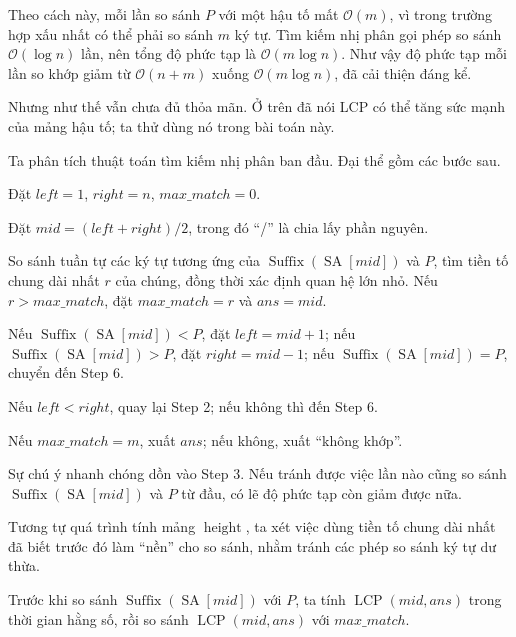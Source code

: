 \documentclass[11pt]{article}
\newcommand{\Oh}{\mathcal{O}}
\newcommand{\SA}{\operatorname{SA}}
\newcommand{\Height}{\operatorname{height}}
\newcommand{\Suf}{\operatorname{Suffix}}
\newcommand{\LCP}{\operatorname{LCP}}
\begin{document}
Theo cách này, mỗi lần so sánh \(P\) với một hậu tố mất \(\Oh(m)\), vì trong
trường hợp xấu nhất có thể phải so sánh \(m\) ký tự. Tìm kiếm nhị phân gọi
phép so sánh \(\Oh(\log n)\) lần, nên tổng độ phức tạp là \(\Oh(m\log n)\).
Như vậy độ phức tạp mỗi lần so khớp giảm từ \(\Oh(n+m)\) xuống
\(\Oh(m\log n)\), đã cải thiện đáng kể.

Nhưng như thế vẫn chưa đủ thỏa mãn. Ở trên đã nói LCP có thể tăng sức mạnh
của mảng hậu tố; ta thử dùng nó trong bài toán này.

Ta phân tích thuật toán tìm kiếm nhị phân ban đầu. Đại thể gồm các bước sau.

\begin{description}[leftmargin=5.8em,style=nextline]
  \item[Step 1.] Đặt \(\mathit{left}=1\), \(\mathit{right}=n\),
  \(\mathit{max\_match}=0\).
  \item[Step 2.] Đặt
  \(\mathit{mid}=(\mathit{left}+\mathit{right})/2\), trong đó ``/'' là chia
  lấy phần nguyên.
  \item[Step 3.] So sánh tuần tự các ký tự tương ứng của
  \(\Suf(\SA[\mathit{mid}])\) và \(P\), tìm tiền tố chung dài nhất \(r\) của
  chúng, đồng thời xác định quan hệ lớn nhỏ. Nếu
  \(r>\mathit{max\_match}\), đặt \(\mathit{max\_match}=r\) và
  \(\mathit{ans}=\mathit{mid}\).
  \item[Step 4.] Nếu \(\Suf(\SA[\mathit{mid}])<P\), đặt
  \(\mathit{left}=\mathit{mid}+1\); nếu \(\Suf(\SA[\mathit{mid}])>P\), đặt
  \(\mathit{right}=\mathit{mid}-1\); nếu \(\Suf(\SA[\mathit{mid}])=P\), chuyển
  đến Step 6.
  \item[Step 5.] Nếu \(\mathit{left}<\mathit{right}\), quay lại Step 2; nếu
  không thì đến Step 6.
  \item[Step 6.] Nếu \(\mathit{max\_match}=m\), xuất \(\mathit{ans}\); nếu
  không, xuất ``không khớp''.
\end{description}

Sự chú ý nhanh chóng dồn vào Step 3. Nếu tránh được việc lần nào cũng so sánh
\(\Suf(\SA[\mathit{mid}])\) và \(P\) từ đầu, có lẽ độ phức tạp còn giảm được
nữa.

Tương tự quá trình tính mảng \(\Height\), ta xét việc dùng tiền tố chung dài
nhất đã biết trước đó làm ``nền'' cho so sánh, nhằm tránh các phép so sánh ký
tự dư thừa.

Trước khi so sánh \(\Suf(\SA[\mathit{mid}])\) với \(P\), ta tính
\(\LCP(\mathit{mid},\mathit{ans})\) trong thời gian hằng số, rồi so sánh
\(\LCP(\mathit{mid},\mathit{ans})\) với \(\mathit{max\_match}\).
\end{document}
